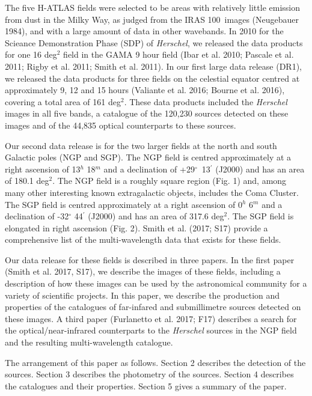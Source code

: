 \documentclass[useAMS,usenatbib]{mnras}
\begin{document}
The five H-ATLAS fields were selected to be areas with relatively
little emission from dust in the Milky Way, as judged from the IRAS
100\micron\ images (Neugebauer 1984), and with a large amount of data
in other wavebands. In 2010 for the Scieance Demonstration Phase (SDP)
of {\it Herschel}, we released the data products for one 16 deg$^2$
field in the GAMA 9 hour field (Ibar et al. 2010; Pascale et al. 2011;
Rigby et al. 2011; Smith et al. 2011).  In our first large data
release (DR1), we released the data products for three fields on the
celestial equator centred at approximately 9, 12 and 15 hours
(Valiante et al. 2016; Bourne et al.  2016), covering a total area of
161 deg$^2$.  These data products included the {\it Herschel} images
in all five bands, a catalogue of the 120,230 sources detected on
these images and of the 44,835 optical counterparts to these sources.

Our second data release is for the two larger fields at the north and south Galactic
poles (NGP and SGP). The NGP field is centred 
approximately at a right ascension of 13$^{h}$ 18$^{m}$ and
a declination of +29$^{\circ}$\ 13$^{\prime}$ (J2000) and has
an area of 180.1 deg$^2$. 
The NGP field is a roughly square region
(Fig. 1) and, among many other interesting known
extragalactic objects, includes the Coma Cluster.
The SGP field is centred approximately at a right ascension of 0$^{h}$ 6$^{m}$ and a declination of -32$^{\circ}$ 44$^{\prime}$ (J2000)
and has an area of 317.6 deg$^2$. The SGP field is elongated
in right ascension (Fig. 2).
Smith et al. (2017; S17) provide a comprehensive list
of the multi-wavelength data that exists for these fields.

Our data release for these fields is
described in three papers. In the first paper (Smith et al. 2017, S17), we describe
the images of these fields, including a description of how these
images can be used by the astronomical community for a variety of scientific
projects.
In this paper, we describe the production and
properties of the catalogues of 
far-infared and submillimetre sources detected on these images. A third paper
(Furlanetto et al. 2017; F17) describes a search for the optical/near-infrared counterparts
to the {\it Herschel} sources in the NGP field and the resulting multi-wavelength catalogue.

The arrangement of this paper as follows. Section 2 
describes the
detection of the sources. Section 3 describes the 
photometry of the sources. Section 4 describes the catalogues
and their properties.
Section 5 gives a summary of the paper.
\end{document}
